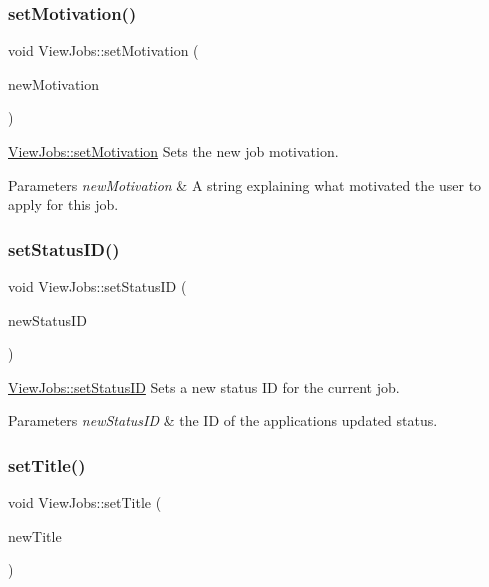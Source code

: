 \subsubsection{\texorpdfstring{set\+Motivation()}{setMotivation()}}
{\footnotesize\ttfamily void View\+Jobs\+::set\+Motivation (\begin{DoxyParamCaption}\item[{Q\+String}]{new\+Motivation }\end{DoxyParamCaption})}



\hyperlink{class_view_jobs_a53bdfabaf2b442841d676f42ebbf975f}{View\+Jobs\+::set\+Motivation} Sets the new job motivation. 


\begin{DoxyParams}{Parameters}
{\em new\+Motivation} & A string explaining what motivated the user to apply for this job. \\
\hline
\end{DoxyParams}
\mbox{\label{class_view_jobs_a55943415fd91377d5f701f7074ba58d6}} 
\subsubsection{\texorpdfstring{set\+Status\+I\+D()}{setStatusID()}}
{\footnotesize\ttfamily void View\+Jobs\+::set\+Status\+ID (\begin{DoxyParamCaption}\item[{int}]{new\+Status\+ID }\end{DoxyParamCaption})}



\hyperlink{class_view_jobs_a55943415fd91377d5f701f7074ba58d6}{View\+Jobs\+::set\+Status\+ID} Sets a new status ID for the current job. 


\begin{DoxyParams}{Parameters}
{\em new\+Status\+ID} & the ID of the application\textquotesingle{}s updated status. \\
\hline
\end{DoxyParams}
\mbox{\label{class_view_jobs_abfe1969197cde57ea049c1b7d91cd4f5}} 
\subsubsection{\texorpdfstring{set\+Title()}{setTitle()}}
{\footnotesize\ttfamily void View\+Jobs\+::set\+Title (\begin{DoxyParamCaption}\item[{Q\+String}]{new\+Title }\end{DoxyParamCaption})}



